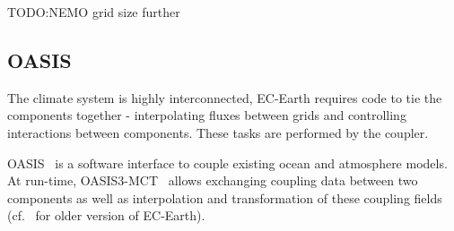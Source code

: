TODO:\gls{NEMO} grid size further

\subsection{OASIS}
The climate system is highly interconnected, EC-Earth requires code to tie the components together - interpolating fluxes between grids and controlling interactions between components. These tasks are performed by the coupler.

OASIS~\cite{gmd-6-373-2013} is a software interface to couple existing ocean and atmosphere models. At run-time, OASIS3-MCT~\cite{oasis3-mct} allows exchanging coupling data between two components as well as interpolation and transformation of these coupling fields 
(cf.~\cite{TM673} for older version of EC-Earth).


% 
%  



